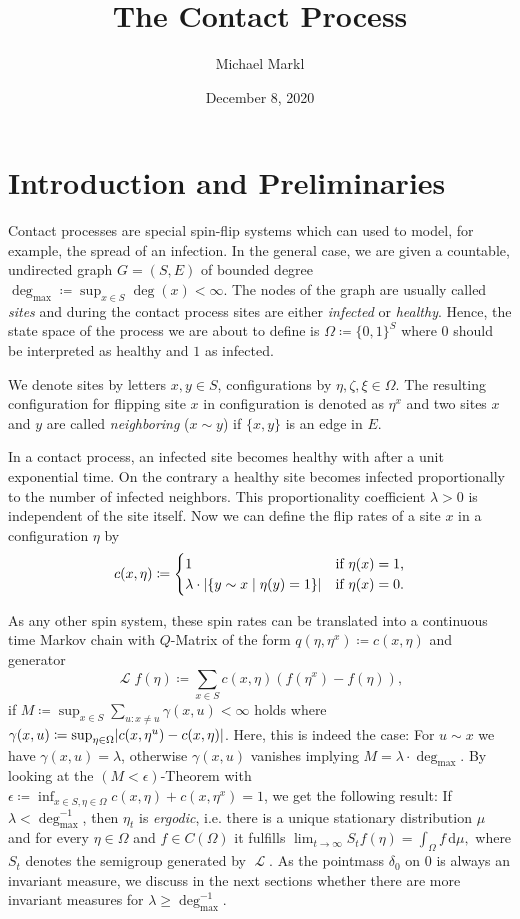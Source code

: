 \documentclass[a4paper,11pt]{amsart}
\title{The Contact Process}
\author{Michael Markl}
\date{December 8, 2020}
\newcommand{\Cont}{C}
\newcommand{\diff}{\,\mathrm{d}}
\DeclareMathOperator{\LGen}{\mathcal{L}}
\DeclarePairedDelimiter\abs{\lvert}{\rvert}%
\begin{document}
\thispagestyle{empty}
\maketitle

\section{Introduction and Preliminaries}

Contact processes are special spin-flip systems which can used to model, for example, the spread of an infection.
In the general case, we are given a countable, undirected graph $G=(S,E)$ of bounded degree $\deg_{\max}\coloneqq \sup_{x\in S} \deg(x) < \infty$.
The nodes of the graph are usually called \emph{sites} and during the contact process sites are either \emph{infected} or \emph{healthy}.
Hence, the state space of the process we are about to define is $\Omega\coloneqq \{0, 1\}^S$ where $0$ should be interpreted as healthy and $1$ as infected.

We denote sites by letters $x,y \in S$, configurations by $\eta, \zeta, \xi\in\Omega$.
The resulting configuration for flipping site $x$ in configuration is denoted as $\eta^x$ and two sites $x$ and $y$ are called \emph{neighboring} ($x \sim y$) if $\{x,y\}$ is an edge in $E$.

In a contact process, an infected site becomes healthy with after a unit exponential time.
On the contrary a healthy site becomes infected proportionally to the number of infected neighbors.
This proportionality coefficient $\lambda > 0$ is independent of the site itself.
Now we can define the flip rates of a site $x$ in a configuration $\eta$ by $$c(x,\eta) \coloneqq \begin{cases}
	1 & \text{if $\eta(x) = 1$,} \\
	\lambda \cdot \abs{ \{ y\sim x \mid \eta(y) = 1 \} } & \text{if $\eta(x) = 0$.}
\end{cases}$$

As any other spin system, these spin rates can be translated into a continuous time Markov chain with $Q$-Matrix of the form $q(\eta, \eta^x) \coloneqq c(x,\eta)$ and generator
$$
\LGen f(\eta) \coloneqq \sum_{x\in S} c(x,\eta) \left( f(\eta^x) - f(\eta) \right),
$$
if $M\coloneqq \sup_{x\in S} \sum_{u:x\neq u} \gamma(x,u) < \infty$ holds where $\gamma(x,u)\coloneqq \sup_{\eta\in\Omega} \abs{ c(x,\eta^u) - c(x,\eta) }$.
Here, this is indeed the case:
For $u\sim x$ we have $\gamma(x,u)=\lambda$, otherwise $\gamma(x,u)$ vanishes implying $M = \lambda \cdot \deg_{\max}$.
By looking at the $(M<\epsilon)$-Theorem with $\epsilon\coloneqq \inf_{x\in S, \eta\in \Omega} c(x,\eta)+ c(x,\eta^x) = 1$, we get the following result:
If  $\lambda <\deg_{\max}^{-1}$, then $\eta_t$ is \emph{ergodic}, i.e. there is a unique stationary distribution $\mu$ and for every $\eta\in\Omega$ and $f\in \Cont(\Omega)$ it fulfills $\lim_{t\to\infty} S_t f(\eta) = \int_\Omega f \diff \mu,$
where $S_t$ denotes the semigroup generated by $\LGen$.
As the pointmass $\delta_0$ on $0$ is always an invariant measure, we discuss in the next sections whether there are more invariant measures for $\lambda \geq \deg_{\max}^{-1}$.
\end{document}
